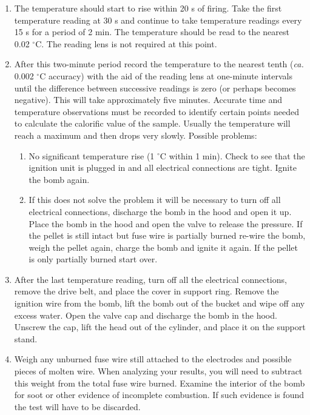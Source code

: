 \documentclass[byrevtex,amssymb,aps,pra,floatfix,letterpaper]{revtex4}
\begin{document}
\begin{enumerate}
\item The temperature should start to rise within 20 s of firing. Take the first temperature reading at 30 s and continue to take temperature readings every 15 s for a period of 2 min. The temperature should be read to the nearest 0.02 $^{\circ}$C. The reading lens is not required at this point.

\item After this two-minute period record the temperature to the nearest tenth (\textit{ca.} 0.002 $^{\circ}$C accuracy) with the aid of the reading lens at one-minute intervals until the difference between successive readings is zero (or perhaps becomes negative). This will take approximately five minutes. Accurate time and temperature observations must be recorded to identify certain points needed to calculate the calorific value of the sample. Usually the temperature will reach a maximum and then drops very slowly. Possible problems:

\begin{enumerate}

\item No significant temperature rise (1 $^{\circ}$C within 1 min). Check to see that the ignition unit is plugged in and all electrical connections are tight. Ignite the bomb again.

\item If this does not solve the problem it will be necessary to turn off all electrical connections, discharge the bomb in the hood and open it up. Place the bomb in the hood and open the valve to release the pressure. If the pellet is still intact but fuse wire is partially burned re-wire the bomb, weigh the pellet again, charge the bomb and ignite it again. If the pellet is only partially burned start over.

\end{enumerate}

\item After the last temperature reading, turn off all the electrical connections, remove the drive belt, and place the cover in support ring. Remove the ignition wire from the bomb, lift the bomb out of the bucket and wipe off any excess water. Open the valve cap and discharge the bomb in the hood. Unscrew the cap, lift the head out of the cylinder, and place it on the support stand.

\item Weigh any unburned fuse wire still attached to the electrodes and possible pieces of molten wire. When analyzing your results, you will need to subtract this weight from the total fuse wire burned. Examine the interior of the bomb for soot or other evidence of incomplete combustion. If such evidence is found the test will have to be discarded.

\end{enumerate}
\end{document}
